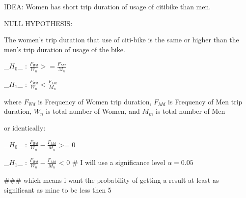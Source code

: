 IDEA:
Women has short trip duration of usage of citibike than men.

NULL HYPOTHESIS:

The women's trip duration that use of citi-bike is the same or higher than the men's trip duration of usage of the bike.

_$H_0$_ : $\frac{F_{Wd}}{W_{n}} >= \frac{F_{Md}}{M_{n}} $ 

_$H_1$_ : $\frac{F_{Wd}}{W_{n}} < \frac{F_{Md}}{M_{n}} $

where $F_{Wd}$ is Frequency of Women trip duration, $F_{Md}$ is Frequency of Men trip duration, ${W_{n}}$ is total number of Women, and ${M_{m}}$ is total number of Men

or identically:

_$H_0$_ : $\frac{F_{Wd}}{W_{n}} - \frac{F_{Md}}{M_{n}} $ >= 0

_$H_1$_ : $\frac{F_{Wd}}{W_{n}} - \frac{F_{Md}}{M_{n}} $ < 0
# I will use a significance level  $\alpha=0.05$

### which means i want the probability of getting a result at least as significant as mine to be less then 5%